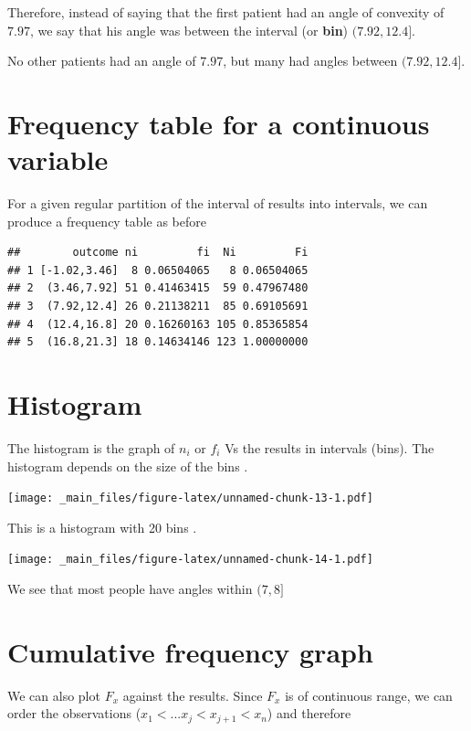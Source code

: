 \documentclass[
]{book}
\begin{document}
Therefore, instead of saying that the first patient had an angle of convexity of \(7.97\), we say that his angle was between the interval (or \textbf{bin}) \((7.92,12.4]\).

No other patients had an angle of \(7.97\), but many had angles between \((7.92,12.4]\).

\hypertarget{frequency-table-for-a-continuous-variable}{%
\section{Frequency table for a continuous variable}\label{frequency-table-for-a-continuous-variable}}

For a given regular partition of the interval of results into intervals, we can produce a frequency table as before

\begin{verbatim}
##        outcome ni         fi  Ni         Fi
## 1 [-1.02,3.46]  8 0.06504065   8 0.06504065
## 2  (3.46,7.92] 51 0.41463415  59 0.47967480
## 3  (7.92,12.4] 26 0.21138211  85 0.69105691
## 4  (12.4,16.8] 20 0.16260163 105 0.85365854
## 5  (16.8,21.3] 18 0.14634146 123 1.00000000
\end{verbatim}

\hypertarget{histogram}{%
\section{Histogram}\label{histogram}}

The histogram is the graph of \(n_i\) or \(f_i\) Vs the results in intervals (bins). The histogram depends on the size of the bins .

\texttt{[image: \_main\_files/figure-latex/unnamed-chunk-13-1.pdf]}

This is a histogram with 20 bins .

\texttt{[image: \_main\_files/figure-latex/unnamed-chunk-14-1.pdf]}

We see that most people have angles within \((7, 8]\)

\hypertarget{cumulative-frequency-graph-1}{%
\section{Cumulative frequency graph}\label{cumulative-frequency-graph-1}}

We can also plot \(F_x\) against the results. Since \(F_x\) is of continuous range, we can order the observations (\(x_1 <... x_j < x_{j+1} < x_n\)) and therefore
\end{document}
